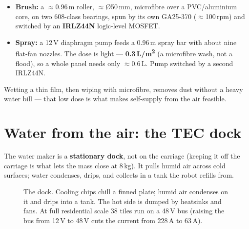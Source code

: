 \documentclass[11pt,a4paper]{article}
\begin{document}
\begin{itemize}[leftmargin=*,itemsep=1pt]
  \item \textbf{Brush:} a $\approx$0.96\,m roller, $\approx$\O50\,mm, microfibre over a PVC/aluminium
  core, on two 608-class bearings, spun by its own GA25-370 ($\approx$100\,rpm) and switched by an
  \textbf{IRLZ44N} logic-level MOSFET.
  \item \textbf{Spray:} a 12\,V diaphragm pump feeds a 0.96\,m spray bar with about nine flat-fan nozzles.
  The dose is light --- \textbf{0.3\,L/m\textsuperscript{2}} (a microfibre wash, not a flood), so a whole
  panel needs only $\approx$0.6\,L. Pump switched by a second IRLZ44N.
\end{itemize}

\noindent Wetting a thin film, then wiping with microfibre, removes dust without a heavy water bill ---
that low dose is what makes self-supply from the air feasible.

\section{Water from the air: the TEC dock}

The water maker is a \textbf{stationary dock}, not on the carriage (keeping it off the carriage is what
lets the mass close at 8\,kg). It pulls humid air across cold surfaces; water condenses, drips, and
collects in a tank the robot refills from.

\begin{figure}[h]
\centering
{}
\caption{The dock. Cooling chips chill a finned plate; humid air condenses on it and drips into a tank.
The hot side is dumped by heatsinks and fans. At full residential scale 38 tiles run on a 48\,V bus
(raising the bus from 12\,V to 48\,V cuts the current from 228\,A to 63\,A).}
\end{figure}
\end{document}
